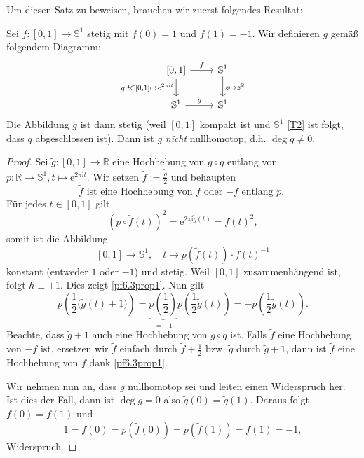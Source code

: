 \documentclass[
12pt, 
openany, 
a4paper, 
final,
fleqn, 
]{myclass}
\numberwithin{equation}{chapter}
\numberwithin{section}{chapter}
\newcommand{\RR}{\mathbb R}
\newcommand{\Ss}{\mathbb S}
\begin{document}
Um diesen Satz zu beweisen, brauchen wir zuerst folgendes Resultat: 
\begin{lem}\label{6.3}
Sei $ f: [0,1]\to \mathbb{S}^{1} $ stetig mit $ f(0)=1 $ und $ f(1) = -1 $. Wir definieren $ g $ gemäß folgendem Diagramm: 
\[ 
\begin{tikzcd}
{[0,1]} \arrow{r}{f}\arrow[swap]{d}{q:t\in [0, 1]\mapsto \mathrm e^{2\pi\mathrm{i}t}} & \Ss^1 \arrow{d}{z\mapsto z^2} \\
\Ss^1 \arrow{r}{g} & \Ss^1
\end{tikzcd}
\]
Die Abbildung $ g $ ist dann stetig (weil $ [0,1] $ kompakt ist und $ \mathbb{S}^{1} $ \ref{T2} ist folgt, dass $ q $ abgeschlossen ist). Dann ist $ g $ \emph{nicht} nullhomotop, d.h. $ \deg g \neq 0 $. 
\end{lem}
\begin{proof}
Sei $\tilde g:[0,1] \to \RR$ eine Hochhebung von $g\circ q$ entlang von $p: \RR \to \Ss^1, t\mapsto \mathrm{e}^{2\pi\mathrm{i}t}$. Wir setzen $\tilde f := \frac{\tilde g}{2}$ und behaupten
\begin{equation}\label{pf6.3prop1}
\text{$\tilde f$ ist eine Hochhebung von $f$ oder $-f$ entlang $p$. }
\end{equation}
Für jedes $t\in [0,1]$ gilt
\[
(p\circ \tilde f(t))^2 = \mathrm{e}^{2\pi \mathrm{i}\tilde g(t)}  = f(t)^2, 
\]
somit ist die Abbildung
\[
[0, 1]\to \Ss^1, \quad t\mapsto p(\tilde f(t)) \cdot f(t)^{-1}
\]
konstant (entweder $1$ oder $-1$) und stetig. Weil $[0,1]$ zusammenhängend ist, folgt $h\equiv \pm 1$. Dies zeigt \eqref{pf6.3prop1}. Nun gilt
\[
p\left( \frac{1}{2}\big( \tilde g(t) + 1 \big) \right) = \underbrace{p\left(\frac{1}{2}\right)}_{=-1}p\left( \frac{1}{2}\tilde g(t) \right) = - p \left(\frac{1}{2} \tilde g(t)\right). 
\]
Beachte, dass $\tilde g+1$ auch eine Hochhebung von $g\circ q$ ist. Falls $\tilde f$ eine Hochhebung von $-f$ ist, ersetzen wir $\tilde f$ einfach durch $\tilde f + \frac{1}{2}$ bzw. $\tilde g $ durch $\tilde g+1$, dann ist $\tilde f$ eine Hochhebung von $f$ dank \eqref{pf6.3prop1}.

Wir nehmen nun an, dass $g$ nullhomotop sei und leiten einen Widerspruch her. Ist dies der Fall, dann ist $\deg g=0$ also $\tilde g(0) = \tilde g(1)$. Daraus folgt $\tilde f(0) = \tilde f(1)$ und 
\[
1 = f(0) = p\left(\tilde f(0) \right) =  p\left(\tilde f(1) \right) = f(1) = -1, 
\]
Widerspruch. 
\end{proof}
\end{document}
